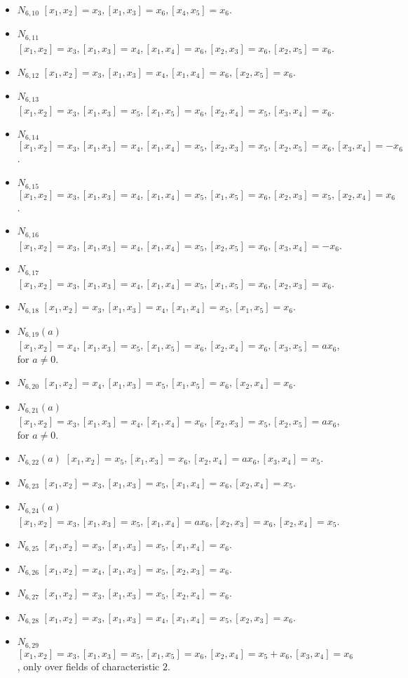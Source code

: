 \documentclass[a4paper,11pt]{report}
\begin{document}
{{\begin{itemize}
\item  $N_{6,10}$ $[x_1,x_2]=x_3, [x_1,x_3]=x_6, [x_4,x_5]=x_6.$ 
\item  $N_{6,11}$ $[x_1,x_2]=x_3, [x_1,x_3]=x_4, [x_1,x_4]=x_6, [x_2,x_3]=x_6, [x_2,x_5]=x_6$.
\item  $N_{6,12}$ $[x_1,x_2]=x_3, [x_1,x_3]=x_4, [x_1,x_4]=x_6, [x_2,x_5]=x_6$.
\item  $N_{6,13}$ $[x_1,x_2]=x_3, [x_1,x_3]=x_5, [x_1,x_5]=x_6, [x_2,x_4]=x_5, [x_3,x_4]=x_6$.
\item  $N_{6,14}$ $[x_1,x_2]=x_3, [x_1,x_3]=x_4, [x_1,x_4]=x_5, [x_2,x_3]=x_5,
[x_2,x_5]=x_6,[x_3,x_4]=-x_6$.
\item  $N_{6,15}$ $[x_1,x_2]=x_3, [x_1,x_3]=x_4, [x_1,x_4]=x_5, [x_1,x_5]=x_6, [x_2,x_3]=x_5,
[x_2,x_4]=x_6$.
\item  $N_{6,16}$ $[x_1,x_2]=x_3, [x_1,x_3]=x_4, [x_1,x_4]=x_5, [x_2,x_5]=x_6, [x_3,x_4]=-x_6$.
\item  $N_{6,17}$ $[x_1,x_2]=x_3, [x_1,x_3]=x_4, [x_1,x_4]=x_5, [x_1,x_5]=x_6, [x_2,x_3]= x_6$.
\item  $N_{6,18}$ $[x_1,x_2]=x_3, [x_1,x_3]=x_4, [x_1,x_4]=x_5, [x_1,x_5]=x_6$.
\item  $N_{6,19}(a)$ $[x_1,x_2]=x_4, [x_1,x_3]=x_5, [x_1,x_5]=x_6, [x_2,x_4]=x_6, [x_3,x_5]=a x_6$, for $a{\ensuremath{\neq}}0$.
\item  $N_{6,20}$ $[x_1,x_2]=x_4, [x_1,x_3]=x_5, [x_1,x_5]=x_6, [x_2,x_4]=x_6$.
\item  $N_{6,21}(a)$ $[x_1,x_2]=x_3, [x_1,x_3]=x_4, [x_1,x_4]=x_6, [x_2,x_3]=x_5, [x_2,x_5]= a x_6$, for $a{\ensuremath{\neq}}0$.
\item  $N_{6,22}(a)$ $[x_1,x_2]=x_5, [x_1,x_3]=x_6, [x_2,x_4]= a x_6, [x_3,x_4]=x_5$.
\item  $N_{6,23}$ $[x_1,x_2]=x_3, [x_1,x_3]=x_5, [x_1,x_4]=x_6, [x_2,x_4]= x_5$.
\item  $N_{6,24}(a)$ $[x_1,x_2]=x_3, [x_1,x_3]=x_5, [x_1,x_4]=a x_6, [x_2,x_3]=x_6, [x_2,x_4]= x_5$.
\item  $N_{6,25}$ $[x_1,x_2]=x_3, [x_1,x_3]=x_5, [x_1,x_4]=x_6$.
\item  $N_{6,26}$ $[x_1,x_2]=x_4, [x_1,x_3]=x_5, [x_2,x_3]=x_6$.
\item  $N_{6,27}$ $[x_1,x_2]=x_3, [x_1,x_3]=x_5, [x_2,x_4]= x_6$.
\item  $N_{6,28}$ $[x_1,x_2]=x_3, [x_1,x_3]=x_4, [x_1,x_4]=x_5, [x_2,x_3]=x_6$.
\item  $N_{6,29}$ $[x_1,x_2]=x_3, [x_1,x_3]=x_5, [x_1,x_5]=x_6, [x_2,x_4]=x_5+x_6, [x_3,x_4]=x_6$, only over fields of characteristic $2$.

\end{itemize}}}
\end{document}
